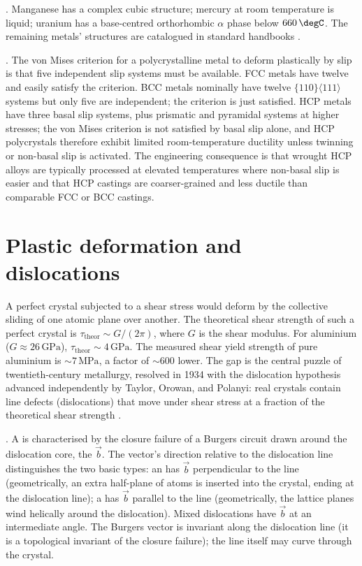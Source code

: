 . Manganese has a complex cubic structure;
mercury at room temperature is liquid; uranium has a base-centred
orthorhombic $\alpha$ phase below $660\,\degC$. The remaining metals'
structures are catalogued in standard handbooks
\cite[ch.~1]{text:smallman-physical-metallurgy}.

. The von Mises criterion
for a polycrystalline metal to deform plastically by slip is that
five independent slip systems must be available. FCC metals have
twelve and easily satisfy the criterion. BCC metals nominally have
twelve $\{110\}\langle 111 \rangle$ systems but only five are
independent; the criterion is just satisfied. HCP metals have three
basal slip systems, plus prismatic and pyramidal systems at higher
stresses; the von Mises criterion is not satisfied by basal slip
alone, and HCP polycrystals therefore exhibit limited room-temperature
ductility unless twinning or non-basal slip is activated. The
engineering consequence is that wrought HCP alloys are typically
processed at elevated temperatures where non-basal slip is easier and
that HCP castings are coarser-grained and less ductile than
comparable FCC or BCC castings.

\section{Plastic deformation and dislocations}

A perfect crystal subjected to a shear stress would deform by the
collective sliding of one atomic plane over another. The theoretical
shear strength of such a perfect crystal is $\tau_{\text{theor}} \sim
G/(2\pi)$, where $G$ is the shear modulus. For aluminium ($G \approx
26\,\text{GPa}$), $\tau_{\text{theor}} \sim 4\,\text{GPa}$. The
measured shear yield strength of pure aluminium is $\sim 7\,\text{MPa}$,
a factor of $\sim 600$ lower. The gap is the central puzzle of
twentieth-century metallurgy, resolved in 1934 with the dislocation
hypothesis advanced independently by Taylor, Orowan, and Polanyi: real
crystals contain line defects (dislocations) that move under shear
stress at a fraction of the theoretical shear strength
\cite[ch.~6]{text:smallman-physical-metallurgy}.

. A
 is characterised by the closure failure of a
Burgers circuit drawn around the dislocation core, the
 $\vec{b}$. The vector's direction relative
to the dislocation line distinguishes the two basic types: an
 has $\vec{b}$ perpendicular to the line
(geometrically, an extra half-plane of atoms is inserted into the
crystal, ending at the dislocation line); a  has $\vec{b}$ parallel to the line (geometrically, the
lattice planes wind helically around the dislocation). Mixed
dislocations have $\vec{b}$ at an intermediate angle. The Burgers
vector is invariant along the dislocation line (it is a topological
invariant of the closure failure); the line itself may curve through
the crystal.

